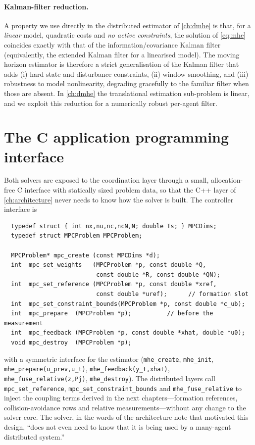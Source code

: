 \paragraph{Kalman-filter reduction.} A property we use directly in the
distributed estimator of \cref{ch:dmhe} is that, for a \emph{linear}
model, quadratic costs and \emph{no active constraints}, the solution of
\cref{eq:mhe} coincides exactly with that of the information/covariance Kalman
filter (equivalently, the extended Kalman filter for a linearised model). The
moving horizon estimator is therefore a strict generalisation of the Kalman
filter that adds (i) hard state and disturbance constraints, (ii) window
smoothing, and (iii) robustness to model nonlinearity, degrading gracefully to
the familiar filter when those are absent. In \cref{ch:dmhe} the translational
estimation sub-problem is linear, and we exploit this reduction for a
numerically robust per-agent filter.

\section{The C application programming interface}
\label{sec:capi}

Both solvers are exposed to the coordination layer through a small, allocation-%
free C interface with statically sized problem data, so that the C++ layer of
\cref{ch:architecture} never needs to know how the solver is built. The
controller interface is
\begin{verbatim}
  typedef struct { int nx,nu,nc,ncN,N; double Ts; } MPCDims;
  typedef struct MPCProblem MPCProblem;

  MPCProblem* mpc_create (const MPCDims *d);
  int  mpc_set_weights   (MPCProblem *p, const double *Q,
                          const double *R, const double *QN);
  int  mpc_set_reference (MPCProblem *p, const double *xref,
                          const double *uref);      // formation slot
  int  mpc_set_constraint_bounds(MPCProblem *p, const double *c_ub);
  int  mpc_prepare  (MPCProblem *p);          // before the measurement
  int  mpc_feedback (MPCProblem *p, const double *xhat, double *u0);
  void mpc_destroy  (MPCProblem *p);
\end{verbatim}
with a symmetric interface for the estimator (\texttt{mhe\_create},
\texttt{mhe\_init}, \texttt{mhe\_prepare(u\_prev,u\_t)},
\texttt{mhe\_feedback(y\_t,xhat)}, \texttt{mhe\_fuse\_relative(z,Pj)},
\texttt{mhe\_destroy}). The distributed layers call \texttt{mpc\_set\_reference},
\texttt{mpc\_set\_constraint\_bounds} and \texttt{mhe\_fuse\_relative} to inject
the coupling terms derived in the next chapters---formation references,
collision-avoidance rows and relative measurements---without any change to the
solver core. The solver, in the words of the architecture note that motivated
this design, ``does not even need to know that it is being used by a many-agent
distributed system.''

